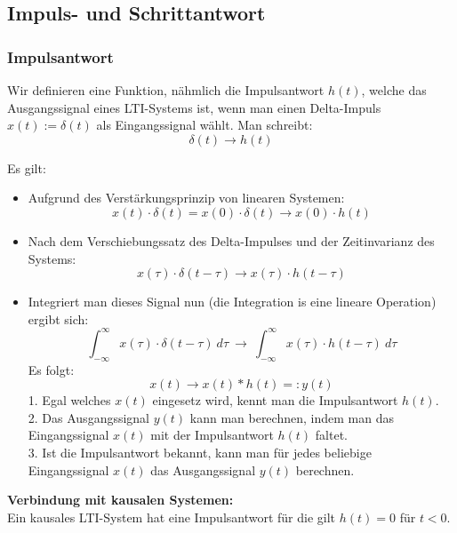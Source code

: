 \documentclass[12pt,a4paper]{scrartcl}
\begin{document}
    \subsection{Impuls- und Schrittantwort}
    \label{sec:sub:impuls-und-schrittantwort}

    \subsubsection{Impulsantwort}
    \label{sec:sub:sub:impulsantwort}

    Wir definieren eine Funktion, nähmlich die Impulsantwort $h(t)$, welche das Ausgangssignal eines LTI-Systems ist, wenn man einen Delta-Impuls $x(t) := \delta(t)$ als Eingangssignal wählt. Man schreibt: 
    $$\delta(t) \to h(t)$$

    \noindent Es gilt:
    \begin{itemize}
    \item Aufgrund des Verstärkungsprinzip von linearen Systemen: \begin{equation}\label{eq:26} x(t) \cdot \delta(t) = x(0) \cdot \delta(t) \to x(0) \cdot h(t) \end{equation} 
    \item Nach dem Verschiebungssatz des Delta-Impulses und der Zeitinvarianz des Systems: \begin{equation}\label{eq:27} x(\tau) \cdot \delta(t-\tau) \to x(\tau) \cdot h(t-\tau) \end{equation}
    \item Integriert man dieses Signal nun (die Integration is eine lineare Operation) ergibt sich: $$\int_{-\infty}^{\infty} x(\tau) \cdot \delta(t-\tau)\ d\tau\ \to\ \int_{-\infty}^{\infty} x(\tau) \cdot h(t-\tau)\ d\tau$$
    Es folgt: \begin{equation}\label{eq:28} x(t) \to x(t) * h(t) =: y(t)\end{equation} 
    1. Egal welches $x(t)$ eingesetz wird, kennt man die Impulsantwort $h(t)$.\\
    2. Das Ausgangssignal $y(t)$ kann man berechnen, indem man das Eingangssignal $x(t)$ mit der Impulsantwort $h(t)$ faltet.\\
    3. Ist die Impulsantwort bekannt, kann man für jedes beliebige Eingangssignal $x(t)$ das Ausgangssignal $y(t)$ berechnen.\\
    \end{itemize}

    \noindent \textbf{Verbindung mit kausalen Systemen:} \\
    \noindent Ein kausales LTI-System hat eine Impulsantwort für die gilt $h(t) = 0$ für $t <0$. \\
\end{document}
